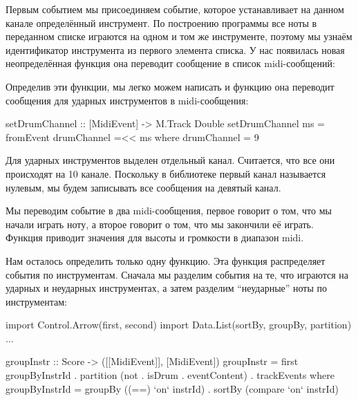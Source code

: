 Первым событием мы присоединяем событие, которое устанавливает на данном
канале определённый инструмент. По построению программы все ноты в
переданном списке играются на одном и том же инструменте, поэтому мы
узнаём идентификатор инструмента из первого элемента списка. У нас
появилась новая неопределённая функция  она переводит
сообщение в список midi-сообщений:



Определив эти функции, мы легко можем написать и функцию
 она переводит сообщения для ударных инструментов в
midi-сообщения:


\begin{code}
setDrumChannel :: [MidiEvent] -> M.Track Double
setDrumChannel ms = fromEvent drumChannel =<< ms 
    where drumChannel = 9        
\end{code}

Для ударных инструментов выделен отдельный канал. Считается, что все они
происходят на 10 канале. Поскольку в библиотеке  первый
канал называется нулевым, мы будем записывать все сообщения на девятый
канал.

Мы переводим событие в два midi-сообщения, первое говорит о том, что мы
начали играть ноту, а второе говорит о том, что мы закончили её играть.
Функция  приводит значения для высоты и громкости в
диапазон midi.

Нам осталось определить только одну функцию. Эта функция распределяет
события по инструментам. Сначала мы разделим события на те, что играются
на ударных и неударных инструментах, а затем разделим ``неударные'' ноты
по инструментам:


\begin{code}
import Control.Arrow(first, second)
import Data.List(sortBy, groupBy, partition)
...

groupInstr :: Score -> ([[MidiEvent]], [MidiEvent])
groupInstr = first groupByInstrId . 
    partition (not . isDrum . eventContent) . trackEvents
    where groupByInstrId = groupBy ((==) `on` instrId) . 
                           sortBy  (compare `on` instrId)
\end{code}

